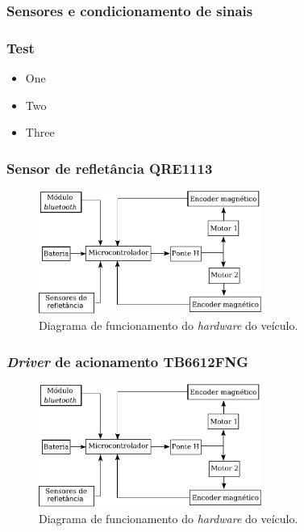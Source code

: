 \begin{frame}[noframenumbering]
\frametitle{Sensores e condicionamento de sinais}



    \transglitter
    \frametitle{Test}
        \begin{itemize}
            \item One
            \item Two
            \item Three
        \end{itemize}
\end{frame}


\begin{frame}
\frametitle{Sensor de refletância QRE1113}

\begin{figure}[th]
	\centering
	\includegraphics[width=0.65\textwidth,keepaspectratio]{Figuras/DiagramaHW.pdf}
	\caption{Diagrama de funcionamento do \textit{hardware} do veículo.\label{fig:diagEl}}
\end{figure}
\end{frame}


\begin{frame}
\frametitle{\textit{Driver} de acionamento TB6612FNG}

\begin{figure}[th]
	\centering
	\includegraphics[width=0.65\textwidth,keepaspectratio]{Figuras/DiagramaHW.pdf}
	\caption{Diagrama de funcionamento do \textit{hardware} do veículo.\label{fig:diagEl}}
\end{figure}
\end{frame}

